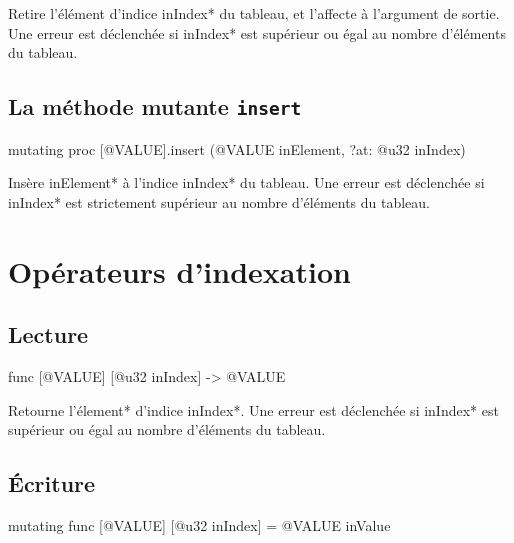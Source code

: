 Retire l'élément d'indice \ggsq*inIndex* du tableau, et l'affecte à l'argument de sortie. Une erreur est déclenchée si \ggsq*inIndex* est supérieur ou égal au nombre d'éléments du tableau.









\subsection{La méthode mutante \texttt{insert}}

\begin{galgas4box}
mutating proc [@VALUE].insert (@VALUE inElement, ?at: @u32 inIndex)
\end{galgas4box}

Insère \ggsq*inElement* à l'indice \ggsq*inIndex* du tableau. Une erreur est déclenchée si \ggsq*inIndex* est strictement supérieur au nombre d'éléments du tableau.











\section{Opérateurs d'indexation}



\subsection{Lecture}

\begin{galgas4box}
func [@VALUE] [@u32 inIndex] -> @VALUE
\end{galgas4box}

Retourne l'élement* d'indice \ggsq*inIndex*. Une erreur est déclenchée si \ggsq*inIndex* est supérieur ou égal au nombre d'éléments du tableau.




\subsection{Écriture}

\begin{galgas4box}
mutating func [@VALUE] [@u32 inIndex] = @VALUE inValue
\end{galgas4box}


